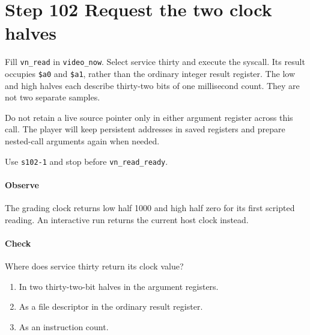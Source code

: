 \section{Step 102 Request the two clock halves}
Fill \texttt{vn\_read} in \texttt{video\_now}. Select service thirty and execute the syscall. Its result occupies \texttt{\$a0} and \texttt{\$a1}, rather than the ordinary integer result register. The low and high halves each describe thirty-two bits of one millisecond count. They are not two separate samples.

Do not retain a live source pointer only in either argument register across this call. The player will keep persistent addresses in saved registers and prepare nested-call arguments again when needed.

Use \texttt{s102-1} and stop before \texttt{vn\_read\_ready}.

\paragraph{Observe} The grading clock returns low half 1000 and high half zero for its first scripted reading. An interactive run returns the current host clock instead.

\paragraph{Check} Where does service thirty return its clock value?
\begin{enumerate}[label=\Alph*.]
  \item In two thirty-two-bit halves in the argument registers.
  \item As a file descriptor in the ordinary result register.
  \item As an instruction count.
\end{enumerate}
